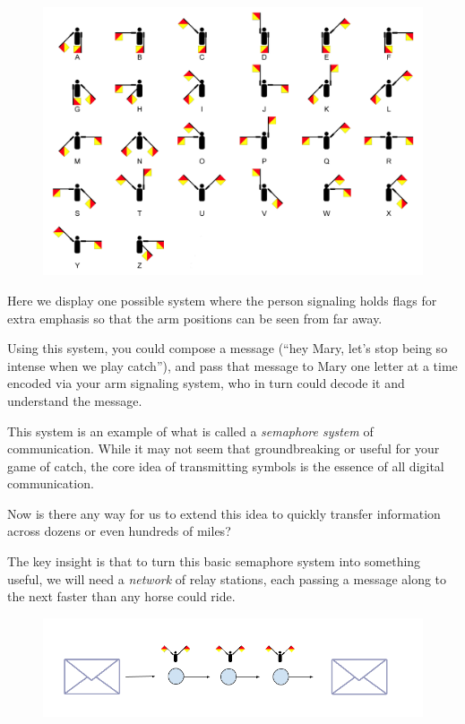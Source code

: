 \documentclass[UTF8]{book}
\begin{document}
\begin{CJK}{UTF8}{gbsn}
\begin{figure}[H]
\centering
\includegraphics[width=0.9\linewidth]{semaphoreflags3}
\end{figure}

Here we display one possible system where the person signaling holds flags for extra emphasis so that the arm positions can be seen from far away.

Using this system, you could compose a message (``hey Mary, let's stop being so intense when we play catch''), and pass that message to Mary one letter at a time encoded via your arm signaling system, who in turn could decode it and understand the message.

This system is an example of what is called a \emph{semaphore system} of communication. While it may not seem that groundbreaking or useful for your game of catch, the core idea of transmitting symbols is the essence of all digital communication.

Now is there any way for us to extend this idea to quickly transfer information across dozens or even hundreds of miles?

The key insight is that to turn this basic semaphore system into something useful, we will need a \emph{network} of relay stations, each passing a message along to the next faster than any horse could ride.

\begin{figure}[H]
\centering
\includegraphics[width=0.9\linewidth]{relay_stations}
\end{figure}


\end{CJK}
\end{document}
